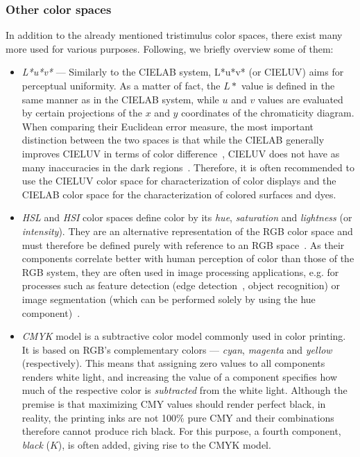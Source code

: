 \subsubsection{Other color spaces}

In addition to the already mentioned tristimulus color spaces, there exist many more used for various purposes. Following, we briefly overview some of them:
\begin{itemize}
\item \emph{L*u*v*} --- Similarly to the CIELAB system, L*u*v* (or CIELUV) aims for perceptual uniformity. As a matter of fact, the $L*$ value is defined in the same manner as in the CIELAB system, while $u$ and $v$ values are evaluated by certain projections of the $x$ and $y$ coordinates of the chromaticity diagram. When comparing their Euclidean error measure, the most important distinction between the two spaces is that while the CIELAB generally improves CIELUV in terms of color difference~\cite{CIELABcomparisonCIELUV}, CIELUV does not have as many inaccuracies in the dark regions~\cite{CIELABDarkSide}. Therefore, it is often recommended to use the CIELUV color space for characterization of color displays and the CIELAB color space for the characterization of colored surfaces and dyes.

\item \emph{HSL} and \emph{HSI} color spaces define color by its \emph{hue}, \emph{saturation} and \emph{lightness} (or \emph{intensity}). They are an alternative representation of the RGB color space and must therefore be defined purely with reference to an RGB space~\cite{HSLreview}. As their components correlate better with human perception of color than those of the RGB system, they are often used in image processing applications, e.g. for processes such as feature detection (edge detection~\cite{edgeDetectionHSL}, object recognition) or image segmentation (which can be performed solely by using the hue component)~\cite{HSLreview}.

\item \emph{CMYK} model is a subtractive color model commonly used in color printing. It is based on RGB's complementary colors --- \emph{cyan}, \emph{magenta} and \emph{yellow} (respectively). This means that assigning zero values to all components renders white light, and increasing the value of a component specifies how much of the respective color is \emph{subtracted} from the white light. Although the premise is that maximizing CMY values should render perfect black, in reality, the printing inks are not 100\% pure CMY and their combinations therefore cannot produce rich black. For this purpose, a fourth component, \emph{black} ($K$), is often added, giving rise to the CMYK model.
\end{itemize}

